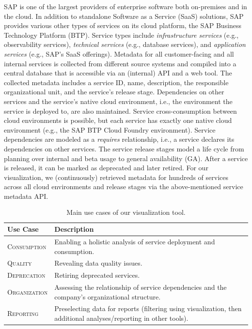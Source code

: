 \documentclass[conference]{IEEEtran}
\begin{document}
SAP is one of the largest providers of enterprise software both on-premises and in the cloud.
In addition to standalone Software as a Service (SaaS) solutions, SAP provides various other types of services on its cloud platform, the SAP Business Technology Platform (BTP).
Service types include \emph{infrastructure services} (e.g., observability services), \emph{technical services} (e.g., database services), and \emph{application services} (e.g., SAP's SaaS offerings). 
Metadata for all customer-facing and all internal services is collected from different source systems and compiled into a central database that is accessible via an (internal) API and a web tool.
The collected metadata includes a service ID, name, description, the responsible organizational unit, and the service's release stage.
Dependencies on other services and the service's native cloud environment, i.e., the environment the service is deployed to, are also maintained.
Service cross-consumption between cloud environments is possible, but each service has exactly one native cloud environment (e.g., the SAP BTP Cloud Foundry environment).
Service dependencies are modeled as a \emph{requires} relationship, i.e., a service declares its dependencies on other services.
The service release stages model a life cycle from planning over internal and beta usage to general availability (GA). After a service is released, it can be marked as deprecated and later retired.
For our visualization, we (continuously) retrieved metadata for hundreds of services across all cloud environments and release stages via the above-mentioned service metadata API.

\begin{table}
\caption{Main use cases of our visualization tool.}
\label{tab:use-cases}
\begin{tabularx}{\columnwidth}{lX}
\hline
\textbf{Use Case} & \textbf{Description} \\
\hline
\textsc{Consumption} & Enabling a holistic analysis of service deployment and consumption. \\
\textsc{Quality} & Revealing data quality issues. \\
\textsc{Deprecation} & Retiring deprecated services. \\
\textsc{Organization} & Assessing the relationship of service dependencies and the company's organizational structure. \\
\textsc{Reporting} & Preselecting data for reports (filtering using visualization, then additional analyses/reporting in other tools).\\
\hline
\end{tabularx}
\end{table}
\end{document}
